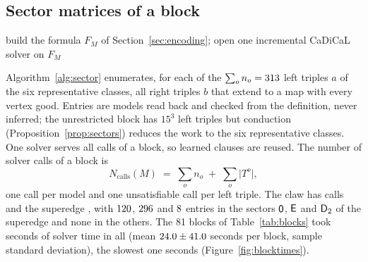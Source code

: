 \subsection{Sector matrices of a block}\label{sec:alg-sector}

\begin{algorithm}[t]
\caption{Sector matrices of a block (projected model enumeration).}\label{alg:sector}
\DontPrintSemicolon
{}
build the formula $F_M$ of Section~\ref{sec:encoding}; open one incremental CaDiCaL solver on $F_M$\;
\end{algorithm}

Algorithm~\ref{alg:sector} enumerates, for each of the $\sum_o n_o = 313$ left triples $a$ of the six
representative classes, all right triples $b$ that extend to a map with every vertex good. Entries are models read back
and checked from the definition, never inferred; the unrestricted block has $15^3$ left triples but conduction
(Proposition~\ref{prop:sectors}) reduces the work to the six representative classes. One solver serves all calls of a block, so
learned clauses are reused. The number of solver calls of a block is
\begin{equation}\label{eq:calls}
N_{\mathrm{calls}}(M) \;=\; \sum_o n_o \;+\; \sum_o \bigl|T^o\bigr| ,
\end{equation}
one call per model and one unsatisfiable call per left triple. The claw has \nCallsClaw{} calls and the superedge
\nCallsSuperedge{}, with $120$, $296$ and $8$ entries in the sectors $\mathsf{0}$, $\mathsf{E}$ and
$\mathsf{D}_2$ of the superedge and none in the others. The 81 blocks of Table~\ref{tab:blocks} took \nBlockTotal{} seconds of solver time in
all (mean $24.0 \pm 41.0$ seconds per block, sample standard deviation), the slowest one \nBlockSlowest{} seconds
(Figure~\ref{fig:blocktimes}).

